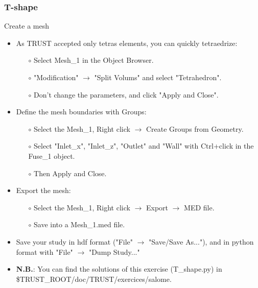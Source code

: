 \documentclass[10pt, hyperref={unicode=true,pdfusetitle, bookmarks=true,bookmarksnumbered=false,bookmarksopen=false, breaklinks=false,pdfborder={0 0 1},backref=true,colorlinks=true,linkcolor=darkblue,pageanchor}]{beamer}
\begin{document}
\begin{frame}
\frametitle{T-shape}
\begin{block}{Create a mesh}

\begin{itemize}
\item As TRUST accepted only tetras elements, you can quickly tetraedrize:
    \begin{itemize}
    \item [$\circ$] Select Mesh\_1 in the Object Browser.
    \item [$\circ$] "Modification" $\rightarrow$ "Split Volums" and select "Tetrahedron".
    \item [$\circ$] Don't change the parameters, and click "Apply and Close".
    \end{itemize}

\item Define the mesh boundaries with Groups:
    \begin{itemize}
    \item [$\circ$] Select the Mesh\_1, Right click $\rightarrow$ Create Groups from Geometry.
    \item [$\circ$] Select "Inlet\_x", "Inlet\_z", "Outlet" and "Wall" with Ctrl+click in the Fuse\_1 object.
    \item [$\circ$] Then Apply and Close.
    \end{itemize}

\item Export the mesh:
    \begin{itemize}
    \item [$\circ$] Select the Mesh\_1, Right click $\rightarrow$ Export $\rightarrow$ MED file.
    \item [$\circ$] Save into a Mesh\_1.med file.
    \end{itemize}

\item Save your study in hdf format ("File" $\rightarrow$ "Save/Save As..."), and in python format with "File" $\rightarrow$ "Dump Study..."

\item \textbf{N.B.}: You can find the solutions of this exercise (T\_shape.py) in \$TRUST\_ROOT/doc/TRUST/exercices/salome.
\end{itemize}

\end{block}
\end{frame}
\end{document}
